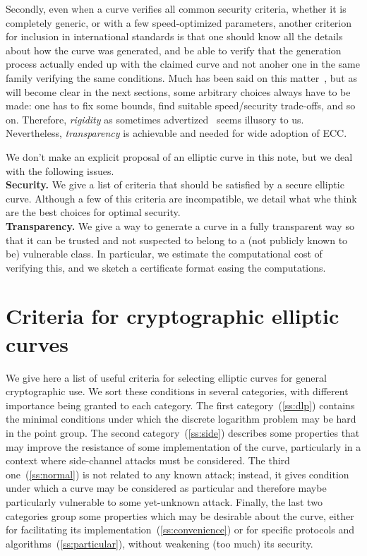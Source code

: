 \documentclass[twocolumn,letterpaper,10pt]{article}
\begin{document}
\medskip
Secondly, even when a curve verifies all common security criteria,
whether it is completely generic, or with a few speed-optimized parameters,
another criterion for inclusion in international standards is that
one should know all the details about how the curve was generated,
and be able to verify that the
generation process actually ended up with the claimed curve
and not anoher one in the same family verifying the same conditions.
Much has been said on this matter~\cite{safecurves,msr2014bcln,eprint2014brainpool,eprint2013abgr},
but as will become clear in the next sections, some arbitrary choices always have
to be made: one has to fix some bounds,
find suitable speed/security trade-offs, and so on.
Therefore, \emph{rigidity} as sometimes advertized~\cite{safecurves} seems illusory
to us.
Nevertheless, \emph{transparency} is achievable and needed for wide adoption of ECC.

\medskip

We don't make an explicit proposal of an elliptic curve in this note,
but we deal with the following issues.
\\{\bf Security. }
We give a list of criteria that should be satisfied by
a secure elliptic curve.
Although a few of this criteria are incompatible,
we detail what whe think are the best choices for optimal security.
\\{\bf Transparency. }
We give a way to generate a curve in a fully transparent way
so that it can be trusted and not suspected to
belong to a (not publicly known to be) vulnerable class.
In particular, we estimate the computational cost of verifying this,
and we sketch a certificate format easing the computations.

\section{Criteria for cryptographic elliptic curves}
\label{s:criteria}
We give here a list of useful criteria for selecting elliptic curves
for general cryptographic use.
We sort these conditions in several categories,
with different importance being granted to each category.
The first category~(\ref{ss:dlp}) contains the minimal conditions under which
the discrete logarithm problem may be hard in the point group.
The second category~(\ref{ss:side}) describes some properties that
may improve the resistance of some implementation of the curve,
particularly in a context where side-channel attacks must be considered.
The third one~(\ref{ss:normal}) is not related to any known attack;
instead, it gives condition under which a curve may be considered
as particular and therefore maybe particularly vulnerable
to some yet-unknown attack.
Finally, the last two categories group some properties
which may be desirable about the curve,
either for facilitating its implementation~(\ref{ss:convenience})
or for specific protocols and algorithms~(\ref{ss:particular}),
without weakening (too much) its security.
\end{document}
